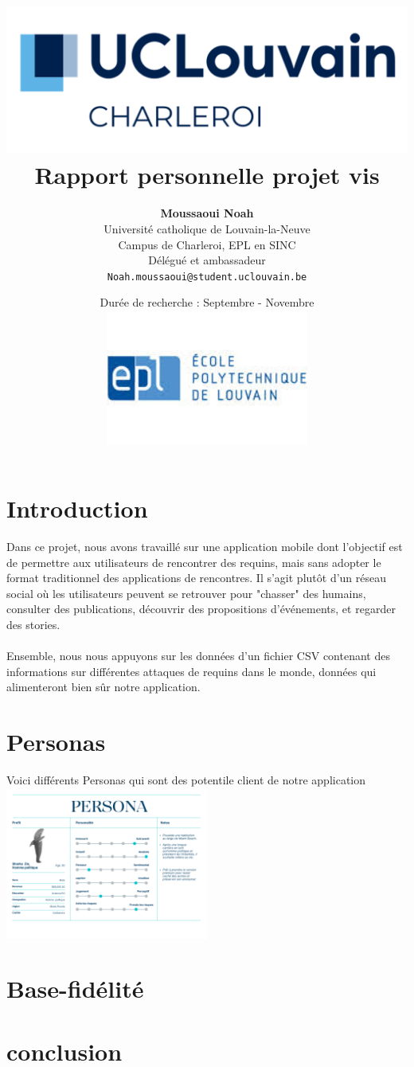 \documentclass{article}
\title{
    \includegraphics[width=1\textwidth]{photo/UCLouvain_Charleroi.png} \\
    \vspace{1.5cm}
    {\Huge \textbf{Rapport personnelle projet vis}} \\
    \vspace{1.5cm}
}
\author{
    \textbf{Moussaoui Noah} \\
    Université catholique de Louvain-la-Neuve \\
    Campus de Charleroi, EPL en SINC \\
    Délégué et ambassadeur \\
    \texttt{Noah.moussaoui@student.uclouvain.be}
}
\date{
    \vspace{1.5cm}
    Durée de recherche : Septembre - Novembre \\
     \vspace{1.5cm}
    \includegraphics[width=0.5\textwidth]{photo/EPL.jpeg}
}
\begin{document}
\maketitle
\newpage
\section{Introduction}
Dans ce projet, nous avons travaillé sur une application mobile dont l'objectif est de permettre 
aux utilisateurs de rencontrer des requins, mais sans adopter le format traditionnel des applications
de rencontres. Il s'agit plutôt d'un réseau social où les utilisateurs peuvent se retrouver pour 
"chasser" des humains, consulter des publications, découvrir des propositions d’événements, 
et regarder des stories.\\\\

Ensemble, nous nous appuyons sur les données d’un fichier CSV contenant des informations 
sur différentes attaques de requins dans le monde, données qui alimenteront bien sûr notre application.


\section{Personas}
Voici différents Personas qui sont des potentile client de notre application
\includegraphics[width=0.5\textwidth]{photo/Personna_Sharkozie.png}




\section{Base-fidélité}


\section{conclusion}
\end{document}
